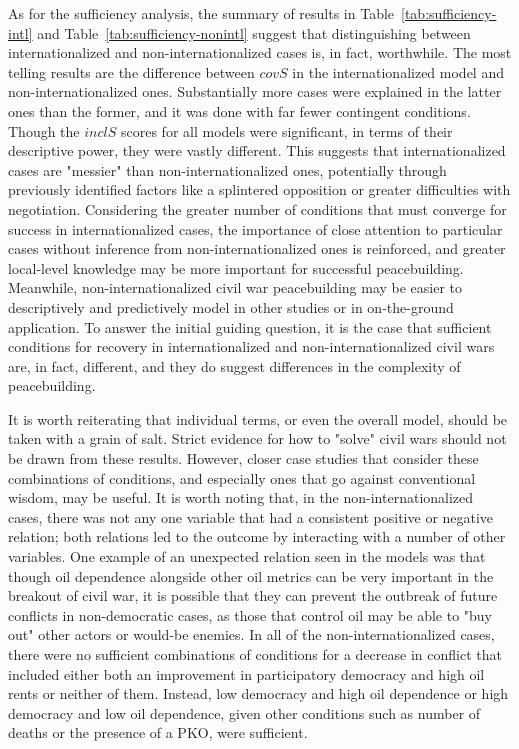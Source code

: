 \documentclass{article}
\begin{document}
As for the sufficiency analysis, the summary of results in Table~\ref{tab:sufficiency-intl} and Table~\ref{tab:sufficiency-nonintl} suggest that distinguishing between internationalized and non-internationalized cases is, in fact, worthwhile. The most telling results are the difference between $covS$ in the internationalized model and non-internationalized ones. Substantially more cases were explained in the latter ones than the former, and it was done with far fewer contingent conditions. Though the $inclS$ scores for all models were significant, in terms of their descriptive power, they were vastly different. This suggests that internationalized cases are "messier" than non-internationalized ones, potentially through previously identified factors like a splintered opposition or greater difficulties with negotiation. Considering the greater number of conditions that must converge for success in internationalized cases, the importance of close attention to particular cases without inference from non-internationalized ones is reinforced, and greater local-level knowledge may be more important for successful peacebuilding. Meanwhile, non-internationalized civil war peacebuilding may be easier to descriptively and predictively model in other studies or in on-the-ground application. To answer the initial guiding question, it is the case that sufficient conditions for recovery in internationalized and non-internationalized civil wars are, in fact, different, and they do suggest differences in the complexity of peacebuilding.

It is worth reiterating that individual terms, or even the overall model, should be taken with a grain of salt. Strict evidence for how to "solve" civil wars should not be drawn from these results. However, closer case studies that consider these combinations of conditions, and especially ones that go against conventional wisdom, may be useful. It is worth noting that, in the non-internationalized cases, there was not any one variable that had a consistent positive or negative relation; both relations led to the outcome by interacting with a number of other variables. One example of an unexpected relation seen in the models was that though oil dependence alongside other oil metrics can be very important in the breakout of civil war, it is possible that they can prevent the outbreak of future conflicts in non-democratic cases, as those that control oil may be able to "buy out" other actors or would-be enemies. In all of the non-internationalized cases, there were no sufficient combinations of conditions for a decrease in conflict that included either both an improvement in participatory democracy and high oil rents or neither of them. Instead, low democracy and high oil dependence or high democracy and low oil dependence, given other conditions such as number of deaths or the presence of a PKO, were sufficient.  
\end{document}
